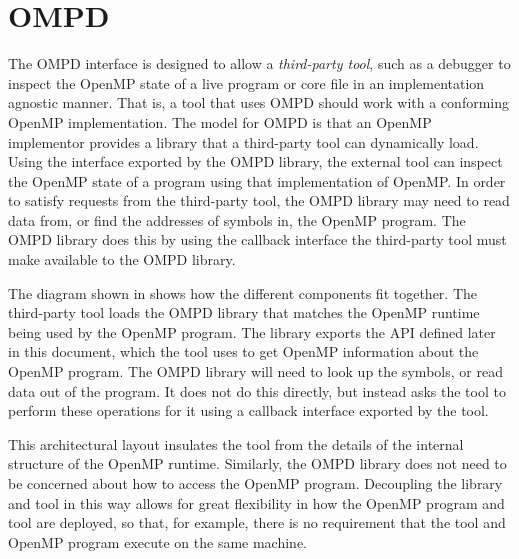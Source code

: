 \section{OMPD}
\label{sec:ompd-overview}
\label{sec:third-party-tool-callback-interface}

The OMPD interface is designed to allow a \emph{third-party tool},
such as a debugger to inspect the OpenMP state of a live program
or core file in an implementation agnostic manner.
That is, a tool that uses OMPD should work with a conforming
OpenMP implementation.
The model for OMPD is that an OpenMP implementor provides a
library that a third-party tool can dynamically load.
Using the interface exported by the OMPD library, the external tool can
inspect the OpenMP state of a program using that implementation of OpenMP.
In order to satisfy requests from the third-party tool, the OMPD library
may need to read data from, or find the addresses of symbols in,
the OpenMP program.
The OMPD library does this by using the callback interface the third-party
tool must make available to the OMPD library.

%


The diagram shown in   shows how the different
components fit together.
The third-party tool loads the OMPD library that matches the OpenMP runtime
being used by the OpenMP program.
The library exports the API defined later in this document,
which the tool uses to get OpenMP information about the OpenMP program.
The OMPD library will need to look up the symbols,
or read data out of the program.
It does not do this directly, but instead asks the tool to perform
these operations for it using a callback interface exported by the tool.

This architectural layout insulates the tool from the details
of the internal structure of the OpenMP runtime.
Similarly, the OMPD library does not need to be concerned about
how to access the OpenMP program.
Decoupling the library and tool in this way allows for
great flexibility in how the OpenMP program and tool are deployed,
so that, for example, there is no requirement that the tool
and OpenMP program execute on the same machine.

